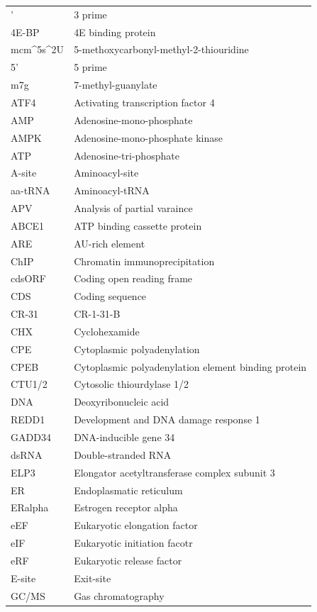 \documentclass[12pt,openany]{book}
\begin{document}
\begin{longtable}{ll}
\endfoot
\bottomrule
\endlastfoot
3' & 3 prime\\
4E-BP & 4E binding protein\\
mcm\textasciicircum{}5s\textasciicircum{}2U & 5-methoxycarbonyl-methyl-2-thiouridine\\
5' & 5 prime\\
m7g & 7-methyl-guanylate\\
\addlinespace
ATF4 & Activating transcription factor 4\\
AMP & Adenosine-mono-phosphate\\
AMPK & Adenosine-mono-phosphate
kinase\\
ATP & Adenosine-tri-phosphate\\
A-site & Aminoacyl-site\\
\addlinespace
aa-tRNA & Aminoacyl-tRNA\\
APV & Analysis of partial varaince\\
ABCE1 & ATP binding cassette protein\\
ARE & AU-rich element\\
ChIP & Chromatin immunoprecipitation\\
\addlinespace
cdsORF & Coding open reading frame\\
CDS & Coding sequence\\
CR-31 & CR-1-31-B\\
CHX & Cyclohexamide\\
CPE & Cytoplasmic polyadenylation\\
\addlinespace
CPEB & Cytoplasmic polyadenylation element binding protein\\
CTU1/2 & Cytosolic thiourdylase 1/2\\
DNA & Deoxyribonucleic acid\\
REDD1 & Development and
DNA damage response 1\\
GADD34 & DNA-inducible gene 34\\
\addlinespace
dsRNA & Double-stranded RNA\\
ELP3 & Elongator acetyltransferase complex subunit 3\\
ER & Endoplasmatic reticulum\\
ERalpha & Estrogen receptor alpha\\
eEF & Eukaryotic elongation factor\\
\addlinespace
eIF & Eukaryotic initiation facotr\\
eRF & Eukaryotic release factor\\
E-site & Exit-site\\
GC/MS & Gas chromatography

\end{longtable}
\end{document}
